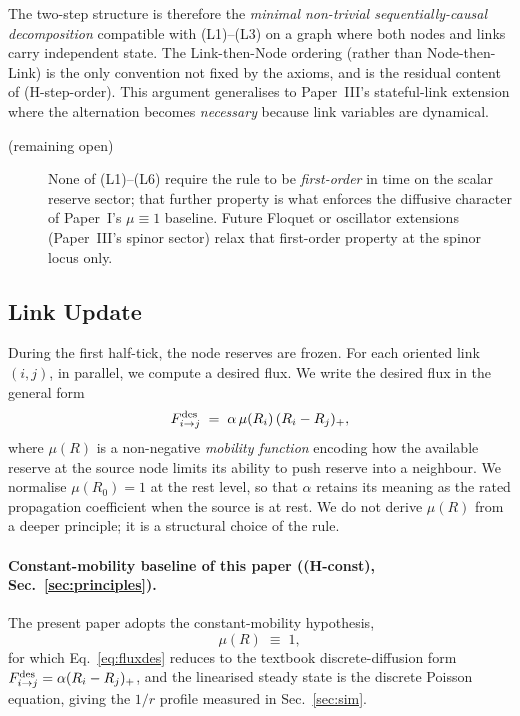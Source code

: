 \documentclass[11pt,a4paper]{article}
\begin{document}
\noindent The two-step structure is therefore the
\emph{minimal non-trivial sequentially-causal decomposition}
compatible with (L1)--(L3) on a graph where both nodes and
links carry independent state. The Link-then-Node ordering
(rather than Node-then-Link) is the only convention not fixed
by the axioms, and is the residual content of (H-step-order).
This argument generalises to Paper~III's stateful-link
extension where the alternation becomes \emph{necessary}
because link variables are dynamical.

\begin{description}
\item[(remaining open)] None of (L1)--(L6) require the rule
to be \emph{first-order} in time on the scalar reserve sector;
that further property is what enforces the diffusive
character of Paper~I's $\mu \equiv 1$ baseline. Future Floquet
or oscillator extensions (Paper~III's spinor sector) relax
that first-order property at the spinor locus only.
\end{description}

\subsection{Link Update}

During the first half-tick, the node reserves are frozen. For
each oriented link $(i, j)$, in parallel, we compute a desired
flux. We write the desired flux in the general form
\begin{equation}
F_{i \to j}^{\rm des} \;=\; \alpha\, \mu(R_i)\, (R_i - R_j)_+,
\label{eq:fluxdes}
\end{equation}
where $\mu(R)$ is a non-negative \emph{mobility function}
encoding how the available reserve at the source node limits
its ability to push reserve into a neighbour. We normalise
$\mu(R_0) = 1$ at the rest level, so that $\alpha$ retains its
meaning as the rated propagation coefficient when the source
is at rest. We do not derive $\mu(R)$ from a deeper principle;
it is a structural choice of the rule.

\paragraph{Constant-mobility baseline of this paper
((H-const), Sec.~\ref{sec:principles}).} The
present paper adopts the constant-mobility hypothesis,
\begin{equation}
\mu(R) \;\equiv\; 1,
\label{eq:mu_const}
\end{equation}
for which Eq.~\eqref{eq:fluxdes} reduces to the textbook
discrete-diffusion form
$F_{i \to j}^{\rm des} = \alpha (R_i - R_j)_+$, and the
linearised steady state is the discrete Poisson equation,
giving the $1/r$ profile measured in Sec.~\ref{sec:sim}.
\end{document}
